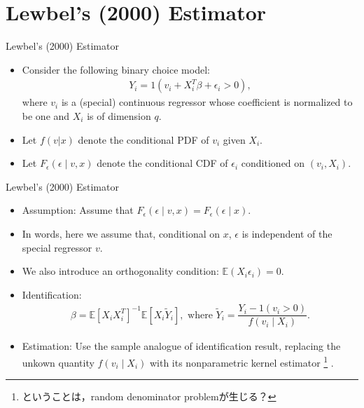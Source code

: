 \documentclass[xcolor=svgnames,dvipdfmx,cjk]{beamer}
\theoremstyle{example}
\def\E{\mathbb{E}}
\begin{document}
  
\section{Lewbel's (2000) Estimator}
  
  
\begin{frame}{Lewbel's (2000) Estimator}
\begin{itemize}
  \item Consider the following binary choice model:
        \begin{align*}
          Y_i = 1(v_i + X_i^T\beta + \epsilon_i > 0),
        \end{align*}
        where $v_i$ is 
        \alert{a (special) continuous regressor whose coefficient is normalized to be one}
        and $X_i$ is of dimension $q$.  
  \item Let $f(v|x)$ denote the conditional PDF of 
        $v_i$ given $X_i$.
  \item Let $F_{\epsilon}(\epsilon\mid v, x)$ denote the conditional CDF of 
        $\epsilon_i$ conditioned on $(v_i, X_i)$.
  
\end{itemize}
\end{frame}  
  
\begin{frame}{Lewbel's (2000) Estimator}
  \begin{itemize}
    \item \alert{Assumption}: 
          Assume that $F_{\epsilon}(\epsilon\mid v, x) = F_{\epsilon}(\epsilon\mid x)$.
    \item In words, here we assume that, conditional on $x$, 
          $\epsilon$ is independent of the special regressor $v$.
    \item We also introduce an orthogonality condition: $\E(X_i\epsilon_i)=0$.
    \item \alert{Identification}:
          \begin{align*}
            \beta = \E[X_i X_i^T]^{-1} \E[X_i \tilde{Y}_i], 
            \text{ where } \tilde{Y}_i = \dfrac{Y_i - 1(v_i > 0)}{f(v_i \mid X_i)}. 
          \end{align*}
    \item \alert{Estimation}: 
          Use the sample analogue of identification result, 
          replacing the unkown quantity $f(v_i \mid X_i)$ 
          with its nonparametric kernel estimator
          \footnote{ということは，random denominator problemが生じる？}
          .
  \end{itemize}
\end{frame}  
  
\end{document}
